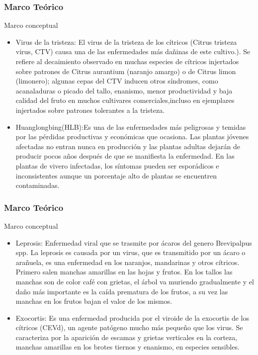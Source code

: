 \documentclass[10pt]{beamer}
\begin{document}
\begin{frame}
\frametitle{Marco Teórico}
\begin{block}{Marco conceptual}
\begin{itemize}
\justifying
\item Virus de la tristeza: El virus de la tristeza de los cítricos (Citrus tristeza virus, CTV) causa una de las enfermedades más
dañinas de este cultivo.). Se refiere al decaimiento observado en muchas especies de cítricos injertados sobre patrones de Citrus aurantium (naranjo amargo) o de Citrus limon (limonero); algunas cepas del CTV inducen otros síndromes, como acanaladuras o picado del tallo, enanismo, menor productividad y baja calidad del fruto en muchos cultivares comerciales,incluso en ejemplares injertados sobre patrones tolerantes a la tristeza.
\item Huanglongbing(HLB):Es una de las enfermedades más peligrosas y temidas por las pérdidas productivas y económicas que ocasiona. Las plantas jóvenes afectadas no entran nunca en producción y las plantas adultas dejarán de producir pocos años después de que se manifiesta la enfermedad. En las plantas de vivero infectadas, los síntomas pueden ser esporádicos e inconsistentes aunque un porcentaje alto de plantas se encuentren contaminadas.
\end{itemize}
\end{block}
\end{frame}

\begin{frame}
\frametitle{Marco Teórico}
\begin{block}{Marco conceptual}
\begin{itemize}
\justifying
\item Leprosis: Enfermedad viral que se trasmite por ácaros del genero Brevipalpus spp. La leprosis es causada por un virus, que es transmitido por un ácaro o arañuela, es una enfermedad en los naranjos, mandarinas y otros cítricos. Primero salen manchas amarillas en las hojas y frutos. En los tallos las manchas son de color café con grietas, el árbol va muriendo gradualmente y el daño más importante es la caída prematura de los frutos, a su vez las manchas en los frutos bajan el valor de los mismos.
\item Exocortis: Es una enfermedad producida por el viroide de la exocortis de los cítricos (CEVd), un agente patógeno mucho más pequeño que los virus. Se caracteriza por la aparición de escamas
y grietas verticales en la corteza, manchas amarillas en los
brotes tiernos y enanismo, en especies sensibles.
\end{itemize}
\end{block}
\end{frame}
\end{document}
